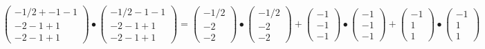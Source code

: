 \documentclass[11pt]{article}
\begin{document}
\begin{equation*}
\begin{pmatrix}
-1/2 + -1 - 1\\
-2 -1 + 1\\
-2 -1 + 1
\end{pmatrix}
\bullet
\begin{pmatrix}
-1/2 -1 - 1\\
-2 -1 + 1\\
-2 -1 + 1
\end{pmatrix}
=
\begin{pmatrix}
-1/2 \\
-2\\
-2
\end{pmatrix}
\bullet
\begin{pmatrix}
-1/2 \\
-2\\
-2
\end{pmatrix}
+
\begin{pmatrix}
-1 \\
-1\\
-1
\end{pmatrix}
\bullet
\begin{pmatrix}
-1 \\
-1\\
-1
\end{pmatrix}
+
\begin{pmatrix}
-1 \\
1\\
1
\end{pmatrix}
\bullet
\begin{pmatrix}
-1 \\
1\\
1
\end{pmatrix}
\end{equation*}
\end{document}
